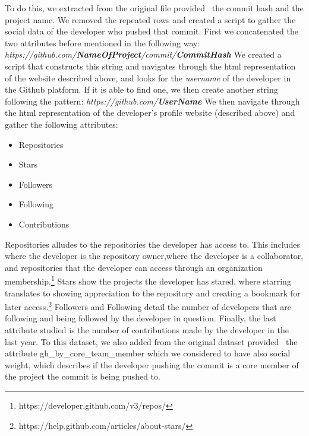 \documentclass[10pt, conference]{IEEEtran}
\begin{document}
To do this, we extracted from the original file provided~\cite{msr17challenge} 
the commit hash and the project name. We removed the repeated rows and created a 
script to gather the social data of the developer who pushed that commit.
First we concatenated the two attributes before mentioned in the following way:
\newline \newline
\textit{https://github.com/\textbf{NameOfProject}/commit/\textbf{CommitHash}}
\newline \newline
We created a script that constructs this string and navigates through the html 
representation of the website described above, and looks for the 
\textit{username} of the developer in the Github platform. If it is able to find 
one, we then create another string following the pattern:
\newline \newline
\textit{https://github.com/\textbf{UserName}}
\newline \newline
We then navigate through the html representation of the developer's profile 
website (described above) and gather the following attributes:
\begin{itemize}
\item Repositories
\item Stars
\item Followers
\item Following
\item Contributions 
\end{itemize}

Repositories alludes to the repositories the developer has access to. This 
includes where the developer is the repository owner,where the developer is a 
collaborator, and repositories that the developer can access through an 
organization membership.\footnote{https://developer.github.com/v3/repos/} Stars 
show the projects the developer has stared, where starring translates to showing 
appreciation to the repository and creating a bookmark for later 
access.\footnote{https://help.github.com/articles/about-stars/} Followers and 
Following detail the number of developers that are following and being followed 
by the developer in question. Finally, the last attribute studied is the number 
of contributions made by the developer in the last year. To this dataset, we 
also added from the original dataset provided~\cite{msr17challenge} the 
attribute gh\_by\_core\_team\_member which we considered to have also social 
weight, which describes if the developer pushing the commit is a core member of 
the project the commit is being pushed to.
\end{document}
